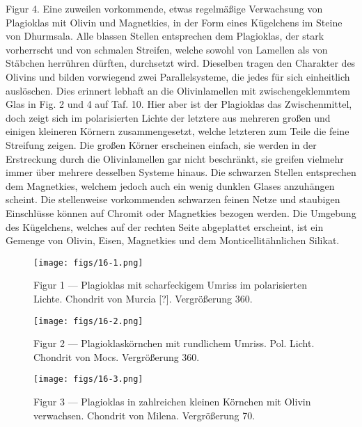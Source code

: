 \documentclass[a4paper, 11pt, oneside, polutonikogreek, german]{article}
\begin{document}
Figur 4. Eine zuweilen vorkommende, etwas regelmäßige Verwachsung von Plagioklas mit Olivin und Magnetkies, in der Form eines Kügelchens im Steine von Dhurmsala. Alle blassen Stellen entsprechen dem Plagioklas, der stark vorherrscht und von schmalen Streifen, welche sowohl von Lamellen als von Stäbchen herrühren dürften, durchsetzt wird. Dieselben tragen den Charakter des Olivins und bilden vorwiegend zwei Parallelsysteme, die jedes für sich einheitlich auslöschen. Dies erinnert lebhaft an die Olivinlamellen mit zwischengeklemmtem Glas in Fig. 2 und 4 auf Taf. 10. Hier aber ist der Plagioklas das Zwischenmittel, doch zeigt sich im polarisierten Lichte der letztere aus mehreren großen und einigen kleineren Körnern zusammengesetzt, welche letzteren zum Teile die feine Streifung zeigen. Die großen Körner erscheinen einfach, sie werden in der Erstreckung durch die Olivinlamellen gar nicht beschränkt, sie greifen vielmehr immer über mehrere desselben Systeme hinaus. Die schwarzen Stellen entsprechen dem Magnetkies, welchem jedoch auch ein wenig dunklen Glases anzuhängen scheint. Die stellenweise vorkommenden schwarzen feinen Netze und staubigen Einschlüsse können auf Chromit oder Magnetkies bezogen werden. Die Umgebung des Kügelchens, welches auf der rechten Seite abgeplattet erscheint, ist ein Gemenge von Olivin, Eisen, Magnetkies und dem Monticellitähnlichen Silikat.
\clearpage

\vspace*{\fill}
\begin{figure}[H]
\centering
\texttt{[image: figs/16-1.png]}
\caption{\small Figur 1 --- Plagioklas mit scharfeckigem Umriss im polarisierten Lichte. Chondrit von Murcia [?]. Vergrößerung 360.}
\end{figure}
\vspace*{\fill}
\clearpage

\vspace*{\fill}
\begin{figure}[H]
\centering
\texttt{[image: figs/16-2.png]}
\caption{\small Figur 2 --- Plagioklaskörnchen mit rundlichem Umriss. Pol. Licht. Chondrit von Mocs. Vergrößerung 360.}
\end{figure}
\vspace*{\fill}
\clearpage

\vspace*{\fill}
\begin{figure}[H]
\centering
\texttt{[image: figs/16-3.png]}
\caption{\small Figur 3 --- Plagioklas in zahlreichen kleinen Körnchen mit Olivin verwachsen. Chondrit von Milena. Vergrößerung 70.}
\end{figure}
\vspace*{\fill}
\clearpage
\end{document}
